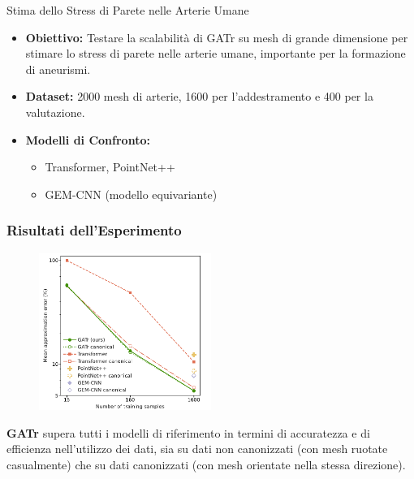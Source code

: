 \begin{frame}{Stima dello Stress di Parete nelle Arterie Umane}
    \begin{itemize}
        \item \textbf{Obiettivo:} Testare la scalabilità di GATr su mesh di grande 
        dimensione per stimare lo stress di parete nelle arterie umane, importante per 
        la formazione di aneurismi.
        \item \textbf{Dataset:} 2000 mesh di arterie, 1600 per l'addestramento e 400 
        per la valutazione.
        \item \textbf{Modelli di Confronto:}
        \begin{itemize}
            \item Transformer, PointNet++
            \item GEM-CNN (modello equivariante)
        \end{itemize}
    \end{itemize}
\end{frame}
    
\begin{frame}
    \frametitle{Risultati dell'Esperimento}
    \begin{figure}
        \centering
        \includegraphics[width=0.5\textwidth]{../Images/arteries.png}
    \end{figure}

    \textbf{GATr} supera tutti i modelli di riferimento in termini di accuratezza e 
    di efficienza nell'utilizzo dei dati, sia su dati non canonizzati 
    (con mesh ruotate casualmente) che su dati canonizzati 
    (con mesh orientate nella stessa direzione).
\end{frame}

